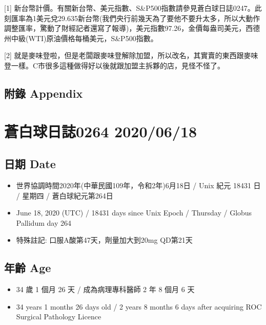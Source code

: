 \documentclass[
]{article}
\providecommand{\tightlist}{%
  \setlength{\itemsep}{0pt}\setlength{\parskip}{0pt}}
\begin{document}
{[}1{]}
新台幣計價。有關新台幣、美元指數、S\&P500指數請參見蒼白球日誌0247。此刻匯率為1美元兌29.635新台幣(我們央行前幾天為了要他不要升太多，所以大動作調整匯率，驚動了財經記者還寫了報導)，美元指數97.26，金價每盎司美元，西德州中級(WTI)原油價格每桶美元，S\&P500指數。

{[}2{]}
就是麥味登啦，但是老闆跟麥味登解除加盟，所以改名，其實賣的東西跟麥味登一樣。C市很多這種做得好以後就跟加盟主拆夥的店，見怪不怪了。

\hypertarget{ux9644ux9304-appendix-14}{%
\subsection{附錄 Appendix}\label{ux9644ux9304-appendix-14}}

\hypertarget{ux84bcux767dux7403ux65e5ux8a8c0264-20200618}{%
\section{蒼白球日誌0264
2020/06/18}\label{ux84bcux767dux7403ux65e5ux8a8c0264-20200618}}

\hypertarget{ux65e5ux671f-date-15}{%
\subsection{日期 Date}\label{ux65e5ux671f-date-15}}

\begin{itemize}
\tightlist
\item
  世界協調時間2020年(中華民國109年，令和2年)6月18日 / Unix 紀元 18431 日
  / 星期四 / 蒼白球紀元第264日
\item
  June 18, 2020 (UTC) / 18431 days since Unix Epoch / Thursday / Globus
  Pallidum day 264
\item
  特殊註記: 口服A酸第47天，劑量加大到20mg QD第21天
\end{itemize}

\hypertarget{ux5e74ux9f61-age-15}{%
\subsection{年齡 Age}\label{ux5e74ux9f61-age-15}}

\begin{itemize}
\tightlist
\item
  34 歲 1 個月 26 天 / 成為病理專科醫師 2 年 8 個月 6 天
\item
  34 years 1 months 26 days old / 2 years 8 months 6 days after
  acquiring ROC Surgical Pathology Licence
\end{itemize}
\end{document}
